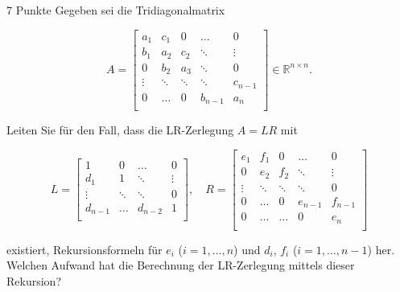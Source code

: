 \documentclass{problemset}
\begin{document}
\begin{problem}{7 Punkte}
Gegeben sei die Tridiagonalmatrix

\[
    A =
    \begin{bmatrix}
        a_1    & c_1    & 0      & \dots   & 0       \\
        b_1    & a_2    & c_2    & \ddots  & \vdots  \\
        0      & b_2    & a_3    & \ddots  & 0       \\
        \vdots & \ddots & \ddots & \ddots  & c_{n-1} \\
        0      & \dots  & 0      & b_{n-1} & a_n     \\
    \end{bmatrix} \in \mathbb{R}^{n \times n}.
\]

Leiten Sie für den Fall, dass die LR-Zerlegung \(A = LR\) mit

\[
    L =
    \begin{bmatrix}
        1       & 0      & \dots   & 0      \\
        d_1     & 1      & \ddots  & \vdots \\
        \vdots  & \ddots & \ddots  & 0      \\
        d_{n-1} & \dots  & d_{n-2} & 1      \\
    \end{bmatrix}, \quad
    R =
    \begin{bmatrix}
        e_1    & f_1    & 0      & \dots   & 0       \\
        0      & e_2    & f_2    & \ddots  & \vdots  \\
        \vdots & \ddots & \ddots & \ddots  & 0       \\
        0      & \dots  & 0      & e_{n-1} & f_{n-1} \\
        0      & \dots  & \dots  & 0       & e_n     \\
    \end{bmatrix}
\]

existiert, Rekursionsformeln für \(e_i\) (\(i = 1, \ldots, n\)) und \(d_i\),
\(f_i\) (\(i = 1, \ldots, n-1\)) her. Welchen Aufwand hat die Berechnung der
LR-Zerlegung mittels dieser Rekursion?
\end{problem}
\end{document}
